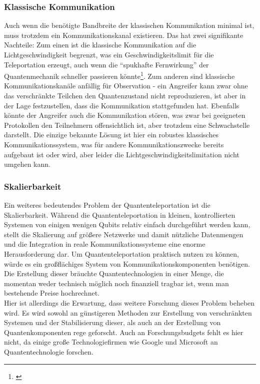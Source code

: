 \subsubsection{Klassische Kommunikation}
Auch wenn die benötigte Bandbreite der klassischen Kommunikation minimal ist, muss trotzdem ein Kommunikationskanal
existieren.
Das hat zwei signifikante Nachteile: Zum einen ist die klassische Kommunikation auf die Lichtgeschwindigkeit begrenzt,
was ein Geschwindigkeitslimit für die Teleportation erzeugt, auch wenn die ``spukhafte Fernwirkung'' der Quantenmechanik
schneller passieren könnte\footnote{\cite{hensen_loophole-free_2015}}.
Zum anderen sind klassische Kommunikationskanäle anfällig für Observation - ein Angreifer kann zwar
ohne das verschränkte Teilchen den Quantenzustand nicht reproduzieren, ist aber in der Lage festzustellen, dass die
Kommunikation stattgefunden hat.
Ebenfalls könnte der Angreifer auch die Kommunikation stören, was zwar bei geeigneten Protokollen den Teilnehmern
offensichtlich ist, aber trotzdem eine Schwachstelle darstellt.
Die einzige bekannte Lösung ist hier ein robustes klassisches Kommunikationssystem, was für andere Kommunikationszwecke
bereits aufgebaut ist oder wird, aber leider die Lichtgeschwindigkeitslimitation nicht umgehen kann.


\subsubsection{Skalierbarkeit}

Ein weiteres bedeutendes Problem der Quantenteleportation ist die Skalierbarkeit.
Während die Quantenteleportation in kleinen, kontrollierten Systemen von einigen wenigen Qubits relativ einfach durchgeführt werden kann,
stellt die Skalierung auf größere Netzwerke und damit nützliche Datenmengen und die Integration in reale Kommunikationssysteme eine enorme Herausforderung dar.
Um Quantenteleportation praktisch nutzen zu können, würde es ein großflächiges System von Kommunikationskomponenten
benötigen.
Die Erstellung dieser bräuchte Quantentechnologien in einer Menge, die momentan weder technisch möglich
noch finanziell tragbar ist, wenn man bestehende Preise hochrechnet.\\

Hier ist allerdings die Erwartung, dass weitere Forschung dieses Problem beheben wird.
Es wird sowohl an günstigeren Methoden zur Erstellung von verschränkten Systemen und der Stabilisierung dieser,
als auch an der Erstellung von Quantenkomponenten rege geforscht.
Auch an Forschungsbudgets fehlt es hier nicht, da einige große Technologiefirmen wie Google und Microsoft an Quantentechnologie forschen.

